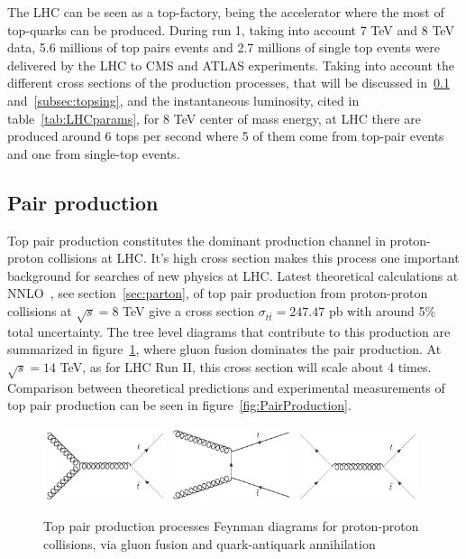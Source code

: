 The LHC can be seen as a top-factory, being the accelerator where the most of top-quarks can be produced. During run 1, taking into account 7 TeV and 8 TeV data, 5.6 millions of top pairs events and 2.7 millions of single top events were delivered by the LHC to CMS and ATLAS experiments. Taking into account the different cross sections of the production processes, that will be discussed in~\ref{subsec:toppair} and~\ref{subsec:topsing}, and the instantaneous luminosity, cited in table~\ref{tab:LHCparams}, for 8 TeV center of mass energy, at LHC there are produced around 6 tops per second where 5 of them come from top-pair events and one from single-top events.  

\subsection{Pair production}
\label{subsec:toppair}

Top pair production constitutes the dominant production channel in proton-proton collisions at LHC. It's high cross section makes this process one important background for searches of new physics at LHC. Latest theoretical calculations at NNLO~\cite{Czakon:2013goa}, see section~\ref{sec:parton}, of top pair production from proton-proton collisions at $\sqrt{s}=8$ TeV give a cross section $\sigma_{t\bar{t}}=247.47$ pb with around 5\% total uncertainty. The tree level diagrams that contribute to this production are summarized in figure~\ref{fig:PairProductionFD}, where gluon fusion dominates the pair production. At $\sqrt{s}=14$ TeV, as for LHC Run II, this cross section will scale about 4 times. Comparison between theoretical predictions and experimental measurements of top pair production can be seen in figure~\ref{fig:PairProduction}.

\begin{figure}[!Hhtbp]
  \begin{center}
    \includegraphics[width=0.32\textwidth]{figs/Gluon_fusion_top_pair.jpg}
    \includegraphics[width=0.32\textwidth]{figs/Gluon_tchannel_top_pair.jpg}
    \includegraphics[width=0.32\textwidth]{figs/Quarks_schannel_top_pair.jpg}
    \caption{Top pair production processes Feynman diagrams for proton-proton collisions, via gluon fusion and quark-antiquark annihilation}
    \label{fig:PairProductionFD}
  \end{center}
\end{figure}

